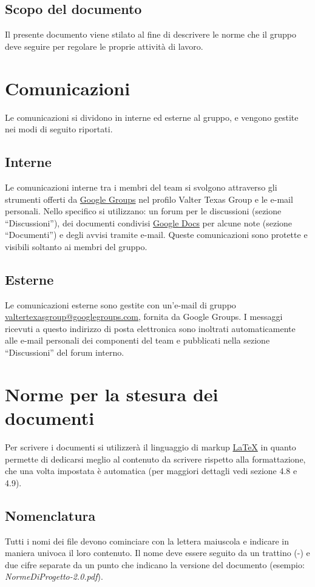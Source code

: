 \section{Scopo del documento}
Il presente documento viene stilato al fine di descrivere le norme che il gruppo
deve seguire per regolare le proprie attivit\`a di lavoro.



\chapter{Comunicazioni}
\thispagestyle{fancy}
Le comunicazioni si dividono in interne ed esterne al gruppo, e vengono gestite
nei modi di seguito riportati.

\section{Interne}
Le comunicazioni interne tra i membri del team si svolgono attraverso gli
strumenti offerti da \underline{Google Groups} nel profilo Valter Texas Group e
le e-mail personali. Nello specifico si utilizzano: un forum per le discussioni
(sezione ``Discussioni''), dei documenti condivisi \underline{Google Docs} per
alcune note (sezione ``Documenti'') e degli avvisi tramite e-mail. 
Queste comunicazioni sono protette e visibili soltanto ai membri del gruppo.


\section{Esterne}
Le comunicazioni esterne sono gestite con un'e-mail di gruppo
\url{valtertexasgroup@googlegroups.com}, fornita da Google Groups. I messaggi
ricevuti a questo indirizzo di posta elettronica sono inoltrati automaticamente alle e-mail personali dei componenti del team e pubblicati nella
sezione ``Discussioni'' del forum interno.


\chapter{Norme per la stesura dei documenti}
\thispagestyle{fancy}
Per scrivere i documenti si utilizzer\`a il linguaggio di markup
\underline{LaTeX} in quanto permette di dedicarsi meglio al contenuto da
scrivere rispetto alla formattazione, che una volta impostata \`e automatica (per maggiori dettagli
vedi sezione 4.8 e 4.9).

\section{Nomenclatura}
Tutti i nomi dei file devono cominciare con la lettera maiuscola e
indicare in maniera univoca il loro contenuto. Il nome deve essere seguito da un
trattino (-) e due cifre separate da un punto che indicano la versione del
documento (esempio: \emph{NormeDiProgetto-2.0.pdf}).


